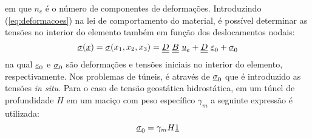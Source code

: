 em que $n_c$  é o número de componentes de deformações. Introduzindo (\ref{eq:deformacoes}) na lei de comportamento do material, é possível determinar as tensões no interior do elemento também em função dos deslocamentos nodais:
\begin{equation}
	\label{eq:tensoes}
	\underline \sigma(\underline x) = \underline \sigma(x_1,x_2,x_3) = \underline{\underline D} ~ \underline{\underline B} ~\underline u_e + \underline{\underline D} ~\underline{\varepsilon}_0 + \underline \sigma_0
\end{equation}
na qual $\underline{\varepsilon}_0$ e $\underline \sigma_0$ são deformações e tensões iniciais no interior do elemento, respectivamente. Nos problemas de túneis, é através de $\underline \sigma_0$ que é introduzido as tensões \textit{in situ}. Para o caso de tensão geostática hidrostática, em um túnel de profundidade $H$ em um maciço com peso específico $\gamma_m$ a seguinte expressão é utilizada:
\begin{equation}
	\label{eq:tensoes_iniciais}
	\underline \sigma_0 = \gamma_m H \underline{1}
\end{equation}

